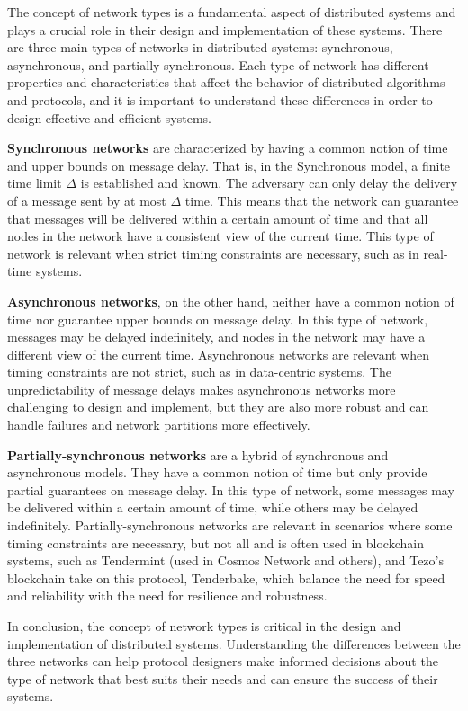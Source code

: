The concept of network types is a fundamental aspect of distributed systems and plays a crucial role in their design and implementation of these systems. There are three main types of networks in distributed systems: synchronous, asynchronous, and partially-synchronous. Each type of network has different properties and characteristics that affect the behavior of distributed algorithms and protocols, and it is important to understand these differences in order to design effective and efficient systems.

\textbf{Synchronous networks} are characterized by having a common notion of time and upper bounds on message delay. 
That is, in the Synchronous model, a finite time limit $\Delta$ is established and known. The adversary can only delay the delivery of a message sent by at most $\Delta$ time.
This means that the network can guarantee that messages will be delivered within a certain amount of time and that all nodes in the network have a consistent view of the current time. This type of network is relevant when strict timing constraints are necessary, such as in real-time systems.

\textbf{Asynchronous networks}, on the other hand, neither have a common notion of time nor guarantee upper bounds on message delay. 
In this type of network, messages may be delayed indefinitely, and nodes in the network may have a different view of the current time. Asynchronous networks are relevant when timing constraints are not strict, such as in data-centric systems. The unpredictability of message delays makes asynchronous networks more challenging to design and implement, but they are also more robust and can handle failures and network partitions more effectively.

\textbf{Partially-synchronous networks} are a hybrid of synchronous and asynchronous models.
They have a common notion of time but only provide partial guarantees on message delay. In this type of network, some messages may be delivered within a certain amount of time, while others may be delayed indefinitely. Partially-synchronous networks are relevant in scenarios where some timing constraints are necessary, but not all and is often used in blockchain systems, such as Tendermint (used in Cosmos Network and others), and Tezo's blockchain take on this protocol, Tenderbake, which balance the need for speed and reliability with the need for resilience and robustness.

In conclusion, the concept of network types is critical in the design and implementation of distributed systems. Understanding the differences between the three networks can help protocol designers make informed decisions about the type of network that best suits their needs and can ensure the success of their systems.

